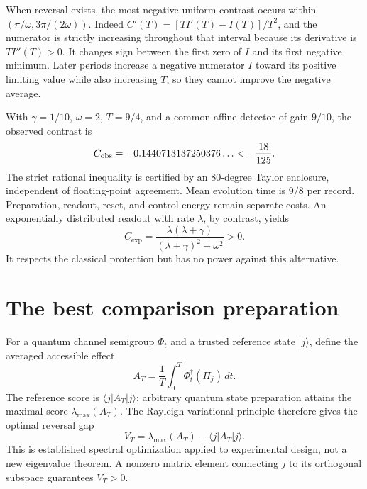 When reversal exists, the most negative uniform contrast occurs within
$(\pi/\omega,3\pi/(2\omega))$.  Indeed
$C'(T)=[T I'(T)-I(T)]/T^2$, and the numerator is strictly increasing throughout
that interval because its derivative is $T I''(T)>0$.  It changes sign between
the first zero of $I$ and its first negative minimum.  Later periods increase
a negative numerator $I$ toward its positive limiting value while also increasing
$T$, so they cannot improve the negative average.

With $\gamma=1/10$, $\omega=2$, $T=9/4$, and a common affine detector of gain
$9/10$, the observed contrast is
\[
 C_{\rm obs}=-0.1440713137250376\ldots<-\frac{18}{125}.
\]
The strict rational inequality is certified by an $80$-degree Taylor enclosure,
independent of floating-point agreement.  Mean evolution time is $9/8$ per
record.  Preparation, readout, reset, and control energy remain separate costs.
An exponentially distributed readout with rate $\lambda$, by contrast, yields
\[
 C_{\exp}=\frac{\lambda(\lambda+\gamma)}
                 {(\lambda+\gamma)^2+\omega^2}>0.
\]
It respects the classical protection but has no power against this alternative.

\section{The best comparison preparation}
\label{sec:rr-spectral-preparation}

For a quantum channel semigroup $\Phi_t$ and a trusted reference state $|j\rangle$,
define the averaged accessible effect
\[
 A_T=\frac1T\int_0^T\Phi_t^\dagger(\Pi_j)\,dt.
\]
The reference score is $\langle j|A_T|j\rangle$; arbitrary quantum state
preparation attains the maximal score $\lambda_{\max}(A_T)$.  The Rayleigh
variational principle therefore gives the optimal reversal gap
\begin{equation}
 V_T=\lambda_{\max}(A_T)-\langle j|A_T|j\rangle.
 \label{eq:rr-spectral-gap}
\end{equation}
This is established spectral optimization applied to experimental design, not a
new eigenvalue theorem.  A nonzero matrix element connecting $j$ to its
orthogonal subspace guarantees $V_T>0$.

